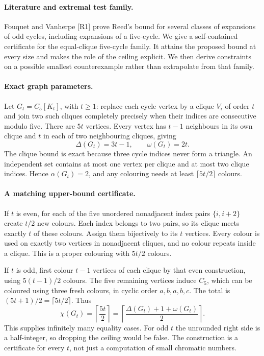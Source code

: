 \documentclass[11pt,a4paper]{article}
\begin{document}
\paragraph{Literature and extremal test family.}
Fouquet and Vanherpe [R1] prove Reed's bound for several classes of
expansions of odd cycles, including expansions of a five-cycle.
We give a self-contained certificate for the equal-clique five-cycle
family. It attains the proposed bound at every size and makes the role
of the ceiling explicit. We then derive constraints on a possible
smallest counterexample rather than extrapolate from that family.

\paragraph{Exact graph parameters.}
Let $G_t=C_5[K_t]$, with $t\ge1$: replace each cycle vertex by a clique
$V_i$ of order $t$ and join two such cliques completely precisely when
their indices are consecutive modulo five. There are $5t$ vertices.
Every vertex has $t-1$ neighbours in its own clique and $t$ in each of
two neighbouring cliques, giving
\[
          \Delta(G_t)=3t-1,\qquad \omega(G_t)=2t.
\]
The clique bound is exact because three cycle indices never form a
triangle. An independent set contains at most one vertex per clique
and at most two clique indices. Hence $\alpha(G_t)=2$, and any colouring
needs at least $\lceil5t/2\rceil$ colours.

\paragraph{A matching upper-bound certificate.}
If $t$ is even, for each of the five unordered nonadjacent index pairs
$\{i,i+2\}$ create $t/2$ new colours. Each index belongs to two pairs,
so its clique meets exactly $t$ of these colours. Assign them bijectively
to its $t$ vertices. Every colour is used on exactly two vertices in
nonadjacent cliques, and no colour repeats inside a clique. This is a
proper colouring with $5t/2$ colours.

If $t$ is odd, first colour $t-1$ vertices of each clique by that even
construction, using $5(t-1)/2$ colours. The five remaining vertices induce
$C_5$, which can be coloured using three fresh colours, in cyclic order
$a,b,a,b,c$. The total is $(5t+1)/2=\lceil5t/2\rceil$. Thus
\[
 \chi(G_t)=\left\lceil\frac{5t}{2}\right\rceil
 =\left\lceil\frac{\Delta(G_t)+1+\omega(G_t)}2\right\rceil.
\]
This supplies infinitely many equality cases. For odd $t$ the unrounded
right side is a half-integer, so dropping the ceiling would be false.
The construction is a certificate for every $t$, not just a computation
of small chromatic numbers.
\end{document}
